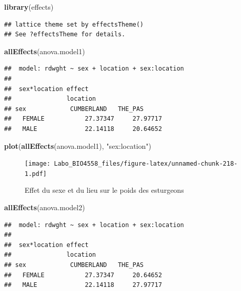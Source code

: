 \documentclass[
  12pt,
]{book}
\newenvironment{Shaded}{\begin{snugshade}}{\end{snugshade}}
\newcommand{\KeywordTok}[1]{\textcolor[rgb]{0.13,0.29,0.53}{\textbf{#1}}}
\newcommand{\NormalTok}[1]{#1}
\newcommand{\StringTok}[1]{\textcolor[rgb]{0.31,0.60,0.02}{#1}}
\begin{document}
\begin{Shaded}
\begin{Highlighting}[]
\KeywordTok{library}\NormalTok{(effects)}
\end{Highlighting}
\end{Shaded}

\begin{verbatim}
## lattice theme set by effectsTheme()
## See ?effectsTheme for details.
\end{verbatim}

\begin{Shaded}
\begin{Highlighting}[]
\KeywordTok{allEffects}\NormalTok{(anova.model1)}
\end{Highlighting}
\end{Shaded}

\begin{verbatim}
##  model: rdwght ~ sex + location + sex:location
## 
##  sex*location effect
##               location
## sex            CUMBERLAND   THE_PAS     
##   FEMALE           27.37347     27.97717
##   MALE             22.14118     20.64652
\end{verbatim}

\begin{Shaded}
\begin{Highlighting}[]
\KeywordTok{plot}\NormalTok{(}\KeywordTok{allEffects}\NormalTok{(anova.model1), }\StringTok{"sex:location"}\NormalTok{)}
\end{Highlighting}
\end{Shaded}

\begin{figure}
\centering
\texttt{[image: Labo\_BIO4558\_files/figure-latex/unnamed-chunk-218-1.pdf]}
\caption{\label{fig:unnamed-chunk-218}Effet du sexe et du lieu sur le poids des esturgeons}
\end{figure}

\begin{Shaded}
\begin{Highlighting}[]
\KeywordTok{allEffects}\NormalTok{(anova.model2)}
\end{Highlighting}
\end{Shaded}

\begin{verbatim}
##  model: rdwght ~ sex + location + sex:location
## 
##  sex*location effect
##               location
## sex            CUMBERLAND   THE_PAS     
##   FEMALE           27.37347     20.64652
##   MALE             22.14118     27.97717
\end{verbatim}
\end{document}
